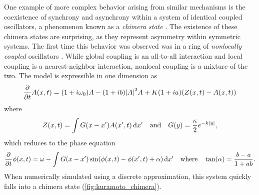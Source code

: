 One example of more complex behavior arising from similar mechanisms is the coexistence of synchrony and asynchrony within a system of identical coupled oscillators, a phenomenon known as a \textit{chimera state} \cite{Kuramoto2002,Abrams2004}.
The existence of these chimera states are surprising, as they represent asymmetry within symmetric systems.
The first time this behavior was observed was in a ring of \textit{nonlocally coupled} oscillators \cite{Kuramoto2002}.
While global coupling is an all-to-all interaction and local coupling is a nearest-neighbor interaction, nonlocal coupling is a mixture of the two.
The model is expressible in one dimension as
\begin{equation}
  \label{eq:kuramoto}
  \pdv{t} A(x, t)
  =
  \pqty{1 + i \omega_{0}} A
  -
  \pqty{1 + i b} \abs{A}^{2} A
  +
  K \pqty{1 + i a} \pqty{Z(x, t) - A(x, t)}
\end{equation}
where
\begin{equation}
  \label{eq:kuramoto_coupling}
  Z(x, t)
  =
  \int{G(x - x') A(x', t) \dd{x'}}
  \qand
  G(y)
  =
  \frac{\kappa}{2} e^{-k \abs{y}},
\end{equation}
which reduces to the phase equation
\begin{equation}
  \label{eq:kuramoto_phase}
  \pdv{t} \phi(x, t)
  =
  \omega
  -
  \int{G(x - x') \sin(\phi(x, t) - \phi(x', t) + \alpha) \dd{x'}}
  \qq{where}
  \tan(\alpha)
  =
  \frac{b - a}{1 + a b}.
\end{equation}
When numerically simulated using a discrete approximation, this system quickly falls into a chimera state (\cref{fig:kuramoto_chimera}).
